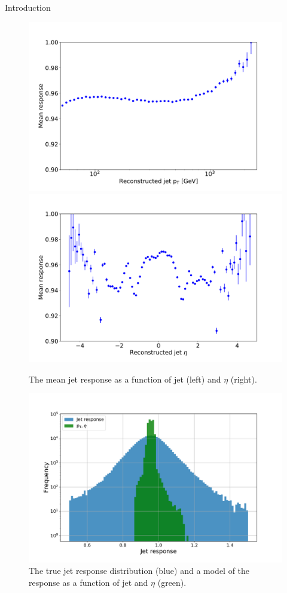 \begin{section}{Introduction}
\begin{figure}[tbp!]
\begin{center}
\includegraphics[angle=0,width=0.48\columnwidth]{fig/response_jetpt.pdf}
\includegraphics[angle=0,width=0.48\columnwidth]{fig/response_jeteta.pdf}
\end{center}
\caption{The mean jet response as a function of jet \pT (left) and $\eta$ (right).}
\label{fig:response_jeteta}
\end{figure}

\begin{figure}[tbp!]
\begin{center}
\includegraphics[angle=0,width=0.80\columnwidth]{fig/nn_prediction.pdf}
\end{center}
\caption{The true jet response distribution (blue) and a model of the response as a function of jet \pT and $\eta$ (green).}
\label{fig:nn_prediction}
\end{figure}


\end{section}

